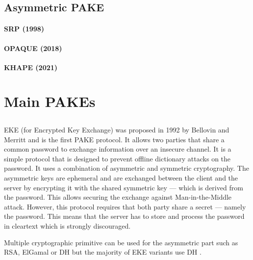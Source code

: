 \documentclass[../report.tex]{subfiles}
\begin{document}
\subsection{Asymmetric PAKE}
\paragraph{SRP (1998)}
\paragraph{OPAQUE (2018)}
\paragraph{KHAPE (2021)}




\section{Main PAKEs}


\subsection{}
\paragraph{}

EKE (for Encrypted Key Exchange) was proposed in 1992 by Bellovin and Merritt \cite{EKE_Paper} and is the first PAKE protocol. 
It allows two parties that share a common password to exchange information over an insecure channel.
It is a simple protocol that is designed to prevent offline dictionary attacks on the password.
It uses a combination of asymmetric and symmetric cryptography.
The asymmetric keys are ephemeral and are exchanged between the client and the server by encrypting it with the shared symmetric key --- which is derived from the password.
This allows securing the exchange against Man-in-the-Middle attack. %
However, this protocol requires that both party share a secret --- namely the password. This means that the server has to store and process the password in cleartext which is strongly discouraged. %


Multiple cryptographic primitive can be used for the asymmetric part such as RSA, ElGamal or DH but the majority of EKE variants use DH \cite{Breaking_EKE}. %
\end{document}
